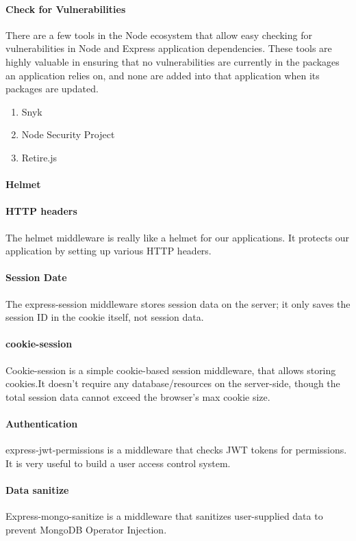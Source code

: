 \paragraph*{Check for Vulnerabilities}
There are a few tools in the Node ecosystem that allow easy checking for vulnerabilities in Node and Express application dependencies. These tools are highly valuable in ensuring that no vulnerabilities are currently in the packages an application relies on, and none are added into that application when its packages are updated.
\begin{enumerate}
      \item Snyk
      \item Node Security Project
      \item Retire.js
\end{enumerate}

\paragraph*{Helmet}
\paragraph*{HTTP headers}
The helmet middleware is really like a helmet for our applications. It protects our application by setting up various HTTP headers.
\paragraph*{Session Date}
The express-session middleware stores session data on the server; it only saves the session ID in the cookie itself, not session data.

\paragraph*{cookie-session}
Cookie-session is a simple cookie-based session middleware, that allows storing cookies.It doesn't require any database/resources on the server-side, though the total session data cannot exceed the browser’s max cookie size.

\paragraph*{Authentication}
express-jwt-permissions is a middleware that checks \ac{JWT} tokens for permissions. It is very useful to build a user access control system.

\paragraph*{Data sanitize}
Express-mongo-sanitize is a middleware that sanitizes user-supplied data to prevent MongoDB Operator Injection.


